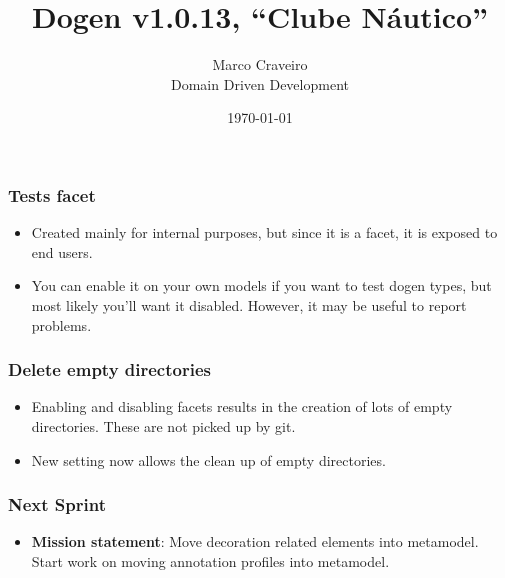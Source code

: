\documentclass{beamer}
\title{Dogen v1.0.13, \enquote{Clube Náutico}}
\author{Marco Craveiro \\
  Domain Driven Development
}
\date{\today}
\begin{document}
\begin{frame}
\titlepage
\end{frame}

\begin{frame}
\frametitle{Tests facet}

\begin{itemize}

  \pause

\item Created mainly for internal purposes, but since it is a facet,
  it is exposed to end users.

  \pause

\item You can enable it on your own models if you want to test dogen
  types, but most likely you'll want it disabled. However, it may be
  useful to report problems.

\end{itemize}

\end{frame}

\begin{frame}
\frametitle{Delete empty directories}

\begin{itemize}

  \pause

\item Enabling and disabling facets results in the creation of lots of
  empty directories. These are not picked up by git.

  \pause

\item New setting now allows the clean up of empty directories.

\end{itemize}

\end{frame}

\begin{frame}
\frametitle{Next Sprint}

\begin{itemize}
\item \textbf{Mission statement}: Move decoration related elements
  into metamodel. Start work on moving annotation profiles into
  metamodel.
\end{itemize}

\end{frame}
\end{document}
